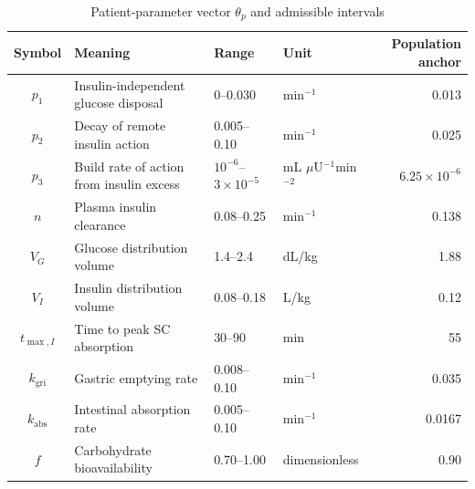 \documentclass[journal]{IEEEtran}
\begin{document}
\begin{table}[t]
\centering
\caption{Patient-parameter vector $\theta_p$ and admissible intervals}
\label{tab:params}
\footnotesize
\begin{tabular}{clllr}
\toprule
Symbol & Meaning & Range & Unit & Population anchor \\
\midrule
$p_1$ & Insulin-independent glucose disposal & 0--0.030 & min$^{-1}$ & 0.013 \\
$p_2$ & Decay of remote insulin action & 0.005--0.10 & min$^{-1}$ & 0.025 \\
$p_3$ & Build rate of action from insulin excess & $10^{-6}$--$3\times10^{-5}$ & mL $\mu$U$^{-1}$min$^{-2}$ & $6.25\times10^{-6}$ \\
$n$ & Plasma insulin clearance & 0.08--0.25 & min$^{-1}$ & 0.138 \\
$V_G$ & Glucose distribution volume & 1.4--2.4 & dL/kg & 1.88 \\
$V_I$ & Insulin distribution volume & 0.08--0.18 & L/kg & 0.12 \\
$t_{\max,I}$ & Time to peak SC absorption & 30--90 & min & 55 \\
$k_{\text{gri}}$ & Gastric emptying rate & 0.008--0.10 & min$^{-1}$ & 0.035 \\
$k_{\text{abs}}$ & Intestinal absorption rate & 0.005--0.10 & min$^{-1}$ & 0.0167 \\
$f$ & Carbohydrate bioavailability & 0.70--1.00 & dimensionless & 0.90 \\
\bottomrule
\end{tabular}
\end{table}
\end{document}
